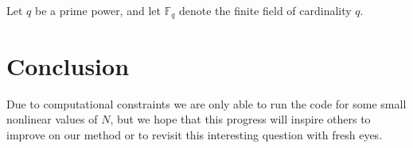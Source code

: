 \documentclass{article}
\newcommand*{\FF}{\mathbb{F}}
\begin{document}
Let $q$ be a prime power, and let $\FF_q$ denote the finite field of cardinality $q$.

\section{Conclusion}

Due to computational constraints we are only able to run the code for some small nonlinear values of $N$, but we hope that this progress will inspire others to improve on our method or to revisit this interesting question with fresh eyes.
\end{document}

